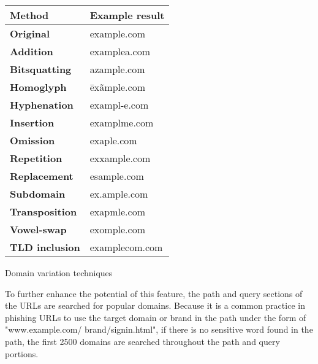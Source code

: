 \begin{singlespace}
	\begin{center}
		\begin{tabular}{  m{13em}  m{13em}  } \toprule

			\textbf{Method}        & \textbf{Example result} \\ \midrule

			\textbf{Original}      & example.com             \\

			\textbf{Addition}      & examplea.com            \\

			\textbf{Bitsquatting}  & azample.com             \\

			\textbf{Homoglyph}     & ēxãmple.com             \\

			\textbf{Hyphenation}   & exampl-e.com            \\

			\textbf{Insertion}     & examplme.com            \\

			\textbf{Omission}      & exaple.com              \\

			\textbf{Repetition}    & exxample.com            \\

			\textbf{Replacement}   & esample.com             \\

			\textbf{Subdomain}     & ex.ample.com            \\

			\textbf{Transposition} & exapmle.com             \\

			\textbf{Vowel-swap}    & exomple.com             \\

			\textbf{TLD inclusion} & examplecom.com          \\ \bottomrule
		\end{tabular}
		\captionsetup{type=table}\caption{Domain variation techniques}
		\label{tab:VARIATIONS}
	\end{center}
\end{singlespace}

To further enhance the potential of this feature, the path and query sections of the URLs are searched for popular domains. Because it is a common practice in phishing URLs to use the target domain or brand in the path under the form of "www.example.com/ brand/signin.html", if there is no sensitive word found in the path, the first 2500 domains are searched throughout the path and query portions.

